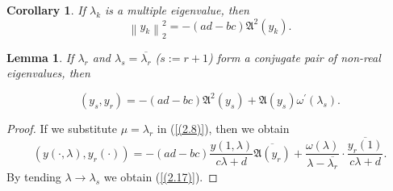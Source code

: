 \documentclass[10pt,a4paper]{amsart}
\newtheorem{cor}[thm]{Corollary}
\newtheorem{lem}[thm]{Lemma}
\numberwithin{equation}{section}
\begin{document}
\begin{cor}
If $\lambda _{k}$ is a multiple eigenvalue, then 
\begin{equation}
{\left\| {y_{k}} \right\|}^{2}_{2}=-(ad-bc)\mathfrak{A}^2(y_{k}).
\label{(2.17)}
\end{equation}
\end{cor}
\begin{lem}
If $\lambda_r$ and $\lambda_s = \overline{\lambda_r}$ ($s:=r+1$) form a conjugate pair of non-real eigenvalues, then

\begin{equation}
(y_{s},y_{r})=-(ad-bc)\mathfrak{A}^2(y_{s})+\mathfrak{A}(y_{s})\omega^\prime(\lambda_s).\label{(2.18)}
\end{equation}
\end{lem}

\begin{proof}
If we substitute $\mu=\lambda_r$ in (\ref{(2.8)}), then we obtain 
$$
\left(y(\cdot,\lambda), y_r(\cdot)\right)
= -(ad - bc)\frac{y(1,\lambda)}{c\lambda + d}\overline{\mathfrak{A}(y_r)}
+ \frac{\omega(\lambda)}{\lambda - \overline{\lambda_r}} \cdot \frac{\overline{y_r(1)}}{c\lambda + d}.
$$
By tending $\lambda\to\lambda_s$ we obtain (\ref{(2.17)}).
\end{proof}
\end{document}

